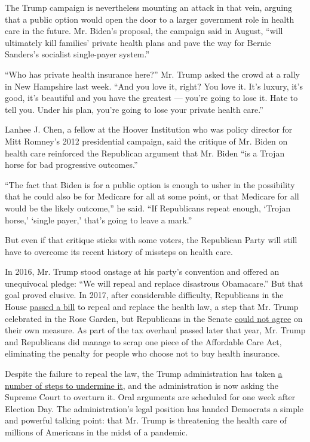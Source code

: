 The Trump campaign is nevertheless mounting an attack in that vein,
arguing that a public option would open the door to a larger government
role in health care in the future. Mr. Biden's proposal, the campaign
said in August, ``will ultimately kill families' private health plans
and pave the way for Bernie Sanders's socialist single-payer system.''

``Who has private health insurance here?'' Mr. Trump asked the crowd at
a rally in New Hampshire last week. ``And you love it, right? You love
it. It's luxury, it's good, it's beautiful and you have the greatest ---
you're going to lose it. Hate to tell you. Under his plan, you're going
to lose your private health care.''

Lanhee J. Chen, a fellow at the Hoover Institution who was policy
director for Mitt Romney's 2012 presidential campaign, said the critique
of Mr. Biden on health care reinforced the Republican argument that Mr.
Biden ``is a Trojan horse for bad progressive outcomes.''

``The fact that Biden is for a public option is enough to usher in the
possibility that he could also be for Medicare for all at some point, or
that Medicare for all would be the likely outcome,'' he said. ``If
Republicans repeat enough, `Trojan horse,' `single payer,' that's going
to leave a mark.''

But even if that critique sticks with some voters, the Republican Party
will still have to overcome its recent history of missteps on health
care.

In 2016, Mr. Trump stood onstage at his party's convention and offered
an unequivocal pledge: ``We will repeal and replace disastrous
Obamacare.'' But that goal proved elusive. In 2017, after considerable
difficulty, Republicans in the House
\href{https://www.nytimes3xbfgragh.onion/2017/05/04/us/politics/health-care-bill-vote.html}{passed
a bill} to repeal and replace the health law, a step that Mr. Trump
celebrated in the Rose Garden, but Republicans in the Senate
\href{https://www.nytimes3xbfgragh.onion/2017/07/27/us/politics/obamacare-partial-repeal-senate-republicans-revolt.html}{could
not agree} on their own measure. As part of the tax overhaul passed
later that year, Mr. Trump and Republicans did manage to scrap one piece
of the Affordable Care Act, eliminating the penalty for people who
choose not to buy health insurance.

Despite the failure to repeal the law, the Trump administration has
taken
\href{https://www.nytimes3xbfgragh.onion/interactive/2017/10/12/us/trump-undermine-obamacare.html}{a
number of steps to undermine it}, and the administration is now asking
the Supreme Court to overturn it. Oral arguments are scheduled for one
week after Election Day. The administration's legal position has handed
Democrats a simple and powerful talking point: that Mr. Trump is
threatening the health care of millions of Americans in the midst of a
pandemic.

